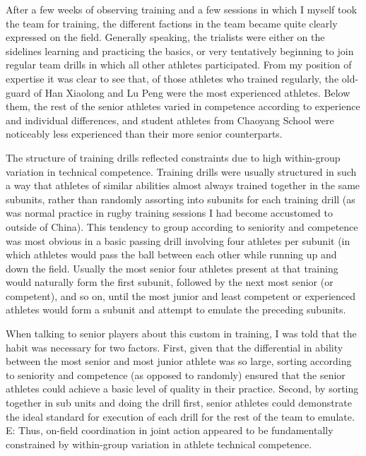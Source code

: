 \begin{CJK}{UTF8}{gbsn}
After a few weeks of observing training and a few sessions in which I myself took the team for training, the different factions in the team became quite clearly expressed on the field.  Generally speaking, the trialists were either on the sidelines learning and practicing the basics, or very tentatively beginning to join regular team drills in which all other athletes participated.  From my position of expertise it was clear to see that, of those athletes who trained regularly, the old-guard of Han Xiaolong and Lu Peng were the most experienced athletes.  Below them, the rest of the senior athletes varied in competence according to experience and individual differences, and student athletes from Chaoyang School were noticeably less experienced than their more senior counterparts.

The structure of training drills reflected constraints due to high within-group variation in technical competence.  Training drills were usually structured in such a way that athletes of similar abilities almost always trained together in the same subunits, rather than randomly assorting into subunits for each training drill (as was normal practice in rugby training sessions I had become accustomed to outside of China).  This tendency to group according to seniority and competence was most obvious in a basic passing drill involving four athletes per subunit (in which athletes would pass the ball between each other while running up and down the field.  Usually the most senior four athletes present at that training would naturally form the first subunit, followed by the next most senior (or competent), and so on, until the most junior and least competent or experienced athletes would form a subunit and attempt to emulate the preceding subunits.

When talking to senior players about this custom in training, I was told that the habit was necessary for two factors.  First, given that the differential in ability between the most senior and most junior athlete was so large, sorting according to seniority and competence (as opposed to randomly) ensured that the senior athletes could achieve a basic level of quality in their practice.  Second, by sorting together in sub units and doing the drill first, senior athletes could demonstrate the ideal standard for execution of each drill for the rest of the team to emulate.
E: Thus, on-field coordination in joint action appeared to be fundamentally constrained by within-group variation in athlete technical competence.


\end{CJK}
